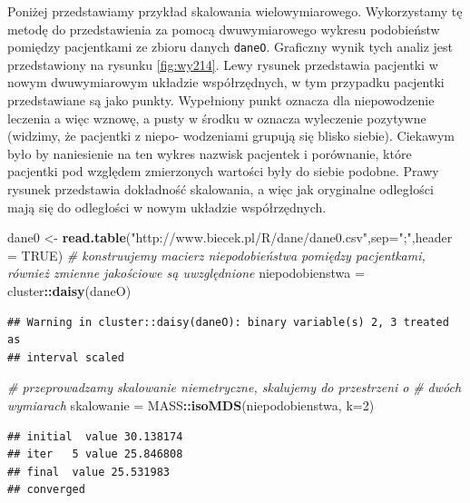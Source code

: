 \documentclass[polish,]{book}
\newenvironment{Shaded}{\begin{snugshade}}{\end{snugshade}}
\newcommand{\CommentTok}[1]{\textcolor[rgb]{0.56,0.35,0.01}{\textit{#1}}}
\newcommand{\DataTypeTok}[1]{\textcolor[rgb]{0.13,0.29,0.53}{#1}}
\newcommand{\DecValTok}[1]{\textcolor[rgb]{0.00,0.00,0.81}{#1}}
\newcommand{\KeywordTok}[1]{\textcolor[rgb]{0.13,0.29,0.53}{\textbf{#1}}}
\newcommand{\NormalTok}[1]{#1}
\newcommand{\OperatorTok}[1]{\textcolor[rgb]{0.81,0.36,0.00}{\textbf{#1}}}
\newcommand{\OtherTok}[1]{\textcolor[rgb]{0.56,0.35,0.01}{#1}}
\newcommand{\StringTok}[1]{\textcolor[rgb]{0.31,0.60,0.02}{#1}}
\begin{document}
Poniżej przedstawiamy przykład skalowania wielowymiarowego. Wykorzystamy
tę metodę do przedstawienia za pomocą dwuwymiarowego wykresu podobieństw
pomiędzy pacjentkami ze zbioru danych \texttt{daneO}. Graficzny wynik tych analiz jest
przedstawiony na rysunku \ref{fig:wy214}. Lewy rysunek przedstawia pacjentki w nowym dwuwymiarowym układzie współrzędnych, w tym przypadku pacjentki przedstawiane są
jako punkty. Wypełniony punkt oznacza dla niepowodzenie leczenia a więc wznowę,
a pusty w środku w oznacza wyleczenie pozytywne (widzimy, że pacjentki z niepo-
wodzeniami grupują się blisko siebie). Ciekawym było by naniesienie na ten wykres
nazwisk pacjentek i porównanie, które pacjentki pod względem zmierzonych wartości
były do siebie podobne. Prawy rysunek przedstawia dokładność skalowania, a więc
jak oryginalne odległości mają się do odległości w nowym układzie współrzędnych.

\begin{Shaded}
\begin{Highlighting}[]
\NormalTok{dane0 <-}\StringTok{ }\KeywordTok{read.table}\NormalTok{(}\StringTok{"http://www.biecek.pl/R/dane/dane0.csv"}\NormalTok{,}\DataTypeTok{sep=}\StringTok{";"}\NormalTok{,}\DataTypeTok{header =} \OtherTok{TRUE}\NormalTok{)}
\CommentTok{# konstruujemy macierz niepodobieństwa pomiędzy pacjentkami, również zmienne jakościowe są uwzględnione}
\NormalTok{niepodobienstwa =}\StringTok{ }\NormalTok{cluster}\OperatorTok{::}\KeywordTok{daisy}\NormalTok{(daneO)}
\end{Highlighting}
\end{Shaded}

\begin{verbatim}
## Warning in cluster::daisy(daneO): binary variable(s) 2, 3 treated as
## interval scaled
\end{verbatim}

\begin{Shaded}
\begin{Highlighting}[]
\CommentTok{# przeprowadzamy skalowanie niemetryczne, skalujemy do przestrzeni o}
\CommentTok{# dwóch wymiarach}
\NormalTok{skalowanie =}\StringTok{ }\NormalTok{MASS}\OperatorTok{::}\KeywordTok{isoMDS}\NormalTok{(niepodobienstwa, }\DataTypeTok{k=}\DecValTok{2}\NormalTok{)}
\end{Highlighting}
\end{Shaded}

\begin{verbatim}
## initial  value 30.138174 
## iter   5 value 25.846808
## final  value 25.531983 
## converged
\end{verbatim}
\end{document}
